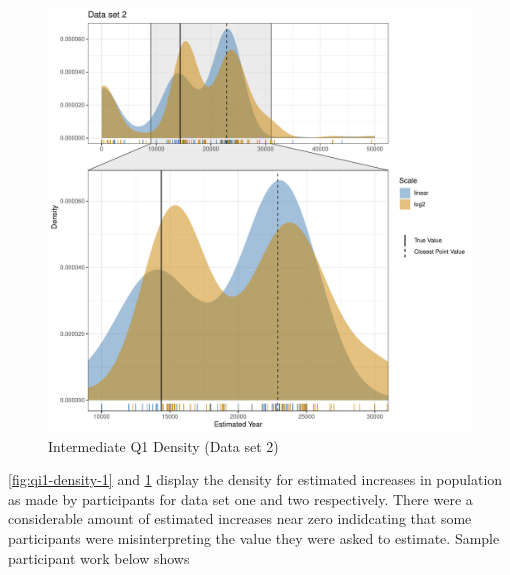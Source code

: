 \documentclass[print]{nuthesis}
\begin{document}
\begin{figure}[tbp]

{\centering \includegraphics[width=1\linewidth,]{thesis_files/figure-latex/qi1-density-2-1} 

}

\caption{Intermediate Q1 Density (Data set 2)}\label{fig:qi1-density-2}
\end{figure}

\cref{fig:qi1-density-1} and \cref{fig:qi1-density-2} display the density for estimated increases in population as made by participants for data set one and two respectively.
There were a considerable amount of estimated increases near zero indidcating that some participants were misinterpreting the value they were asked to estimate.
Sample participant work below shows
\end{document}
